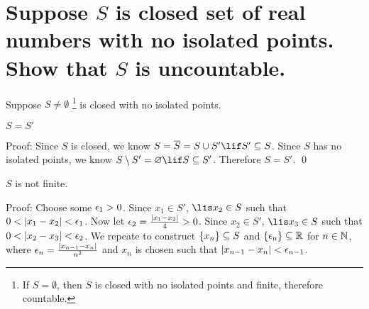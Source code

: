\documentclass[10pt, letterpaper, titlepage]{article}
\begin{document}
    \section{Suppose $S$ is \textbf{closed}  set of real numbers with no isolated points. 
      Show that $S$ is uncountable. }
      Suppose $S \neq \emptyset$
        \footnote{If $S = \emptyset$, then $S$ is closed with no isolated points and finite, 
        therefore countable.} 
      is closed with no isolated points.

      \begin{lemma}
        $S = S'$
      \end{lemma}
      Proof:
      Since $S$ is closed, we know $S = \overline S = S \union S' \lif S' \subseteq S$.
      Since $S$ has no isolated points, we know $S \setminus S' = \emptyset \lif S \subseteq S'$.
      Therefore $S = S'$.
      \qed

      \begin{lemma}
        $S$ is not finite.
      \end{lemma}
      Proof: 
      Choose some $\epsilon_1 > 0$.
      Since $x_1 \in S'$,
      $\lis x_2 \in S$ such that $0 < \left|x_1-x_2\right| < \epsilon_1$.
      Now let $\epsilon_2 = \frac{\left|x_1 - x_2\right|}{4} > 0$.
      Since $x_2 \in S'$, $\lis x_3 \in S$ such that $0 < \left|x_2-x_3\right| < \epsilon_2$.
      We repeate to construct $\{ x_n \} \subseteq S$
      and $\{ \epsilon_n \}\subseteq\mathbb{R}$ for $n \in \mathbb{N}$,
      where $\epsilon_n = \frac{\left|x_{n-1} - x_{n}\right|}{n^2}$
      and $x_n$ is chosen such that $\left|x_{n-1} - x_{n}\right| < \epsilon_{n-1}$.
\end{document}

